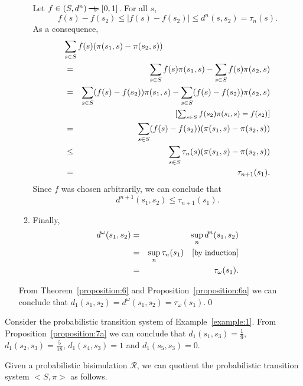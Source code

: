 \documentclass{LMCS}
\newcommand{\ndi}{\mathbin{\raisebox{0.15ex}{-\hspace{-0.2em}-\hspace{-0.2em}-\hspace{-0.2em}-\hspace{-0.2em}-\hspace{-0.2em}-}\hspace{-0.7em}\succcurlyeq}}
\newcommand{\comment}[1]{\hspace{1em}\mbox{[{\small #1}]}}
\begin{document}
\begin{enumerate}[$\bullet$]
\begin{enumerate}[$-$]
Let $f \in (S, d^n) \ndi [0, 1]$.  For all $s$,
\begin{displaymath}
f(s) - f(s_2) \leq | f(s) - f(s_2) | \leq d^n(s, s_2) = \tau_n(s).
\end{displaymath}
As a consequence,
\begin{eqnarray*}
\lefteqn{\sum_{s \in S} f(s) (\pi(s_1, s) - \pi(s_2, s))}\\
& = & \sum_{s \in S} f(s) \pi(s_1, s) - \sum_{s \in S} f(s) \pi(s_2, s)\\
& = & \sum_{s \in S} (f(s) - f(s_2)) \pi(s_1, s) - \sum_{s \in S} (f(s) - f(s_2)) \pi(s_2, s)\\
&& \comment{$\sum_{s \in S} f(s_2) \pi(s_i, s) = f(s_2)$}\\
& = & \sum_{s \in S} (f(s) - f(s_2)) (\pi(s_1, s) - \pi(s_2, s))\\
& \leq & \sum_{s \in S} \tau_n(s)(\pi(s_1, s) - \pi(s_2, s))\\
& = & \tau_{n+1}(s_1).
\end{eqnarray*}
Since $f$ was chosen arbitrarily, we can conclude that
\begin{displaymath}
d^{n+1}(s_1, s_2) \leq \tau_{n+1}(s_1).
\end{displaymath}
\item
Finally,
\begin{eqnarray*}
d^{\omega}(s_1, s_2)
& = & \sup_n d^n(s_1, s_2)\\
& = & \sup_n \tau_n(s_1) 
\comment{by induction}\\
& = & \tau_{\omega}(s_1).
\end{eqnarray*}
\end{enumerate}
From Theorem~\ref{proposition:6} and Proposition~\ref{proposition:6a} we can conclude 
that $d_1(s_1, s_2) = d^{\omega}(s_1, s_2) = \tau_{\omega}(s_1)$.\qed
\end{enumerate}


\begin{exa}
Consider the probabilistic transition system of Example~\ref{example:1}.
From Proposition~\ref{proposition:7a} we can conclude that
$d_1(s_1, s_3) = \frac{1}{9}$, $d_1(s_2, s_3) = \frac{5}{18}$,
$d_1(s_4, s_3) = 1$ and $d_1(s_5, s_3) = 0$.
\end{exa}

Given a probabilistic bisimulation $\mathcal{R}$, we can quotient the probabilistic
transition system $<S, \pi>$ as follows.
\end{document}
